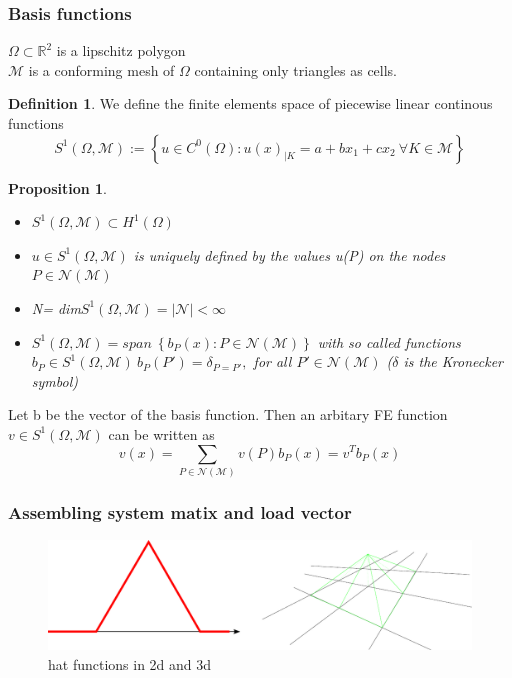 \documentclass[english]{article}
\newtheorem*{prop}{Proposition}
\theoremstyle{definition}
\newtheorem*{defi}{Definition}
\theoremstyle{remark}
\newcommand{\M}{\mathcal{M}}
\newcommand{\N}{\mathcal{N}}
\newcommand{\RR}{\mathbb{R}}			%
\newcommand{\dd}{\delta}				%
\newcommand{\OO}{\Omega}
\begin{document}
\subsubsection{Basis functions}
$\OO\subset \RR^2$ is a lipschitz polygon\\
$\M$ is a conforming mesh of $\OO$ containing only triangles as cells.
\begin{defi} We define  the finite elements space of piecewise linear continous functions
  $$S^1 (\OO,\M) := \left\{u \in C^0 (\OO) : u(x)_{|K} = a+bx_1+cx_2 \ \forall K \in \M\right\}$$
\end{defi}
\begin{prop}
  \begin{itemize}
  \item $S^1 (\OO,\M) \subset H^1(\OO)$
  \item $u \in S^1(\OO,\M) $ is uniquely defined by the values u(P) on the nodes $P \in \N(\M)$
  \item N= dim$ S^1(\OO,\M) = |\N | <\infty$
  \item $S^1(\OO,\M) = span\ \left\{b_P(x) : P\in \N(\M) \right\} $ with so called functions $b_P \in S^1(\OO,\M) \ b_P(P') = \dd_{P=P'}, $ for all $P'\in \N(\M)$ ($\dd$ is the Kronecker symbol)
  \end{itemize}
\end{prop}
Let b be the vector of the basis function. Then an arbitary FE function $v \in  S^1(\OO,\M)$ can be written as 
$$v(x) = \sum_{P \in \N(\M)} v(P) b_P(x) = v^T b_P(x)$$
\subsubsection{Assembling system matix and load vector}
\begin{figure}[tbh]
  \begin{center}
    \includegraphics[width=\textwidth]{figs/hatFunction.pdf}
  \end{center}
  \caption{hat functions in 2d and 3d}
  \label{hat-functions-figure}
\end{figure}
\end{document}
